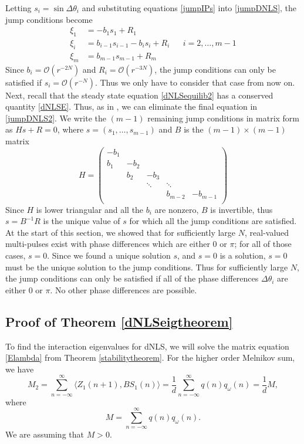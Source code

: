 \documentclass[12pt]{article}
\begin{document}
Letting $s_i = \sin{\Delta\theta_i}$ and substituting equations \eqref{jumpIPs} into \eqref{jumpDNLS}, the jump conditions become
\begin{equation}\label{jumpDNLS2}
\begin{aligned}
\xi_1 &= -b_1 s_1 + R_1 \\
\xi_i &= b_{i-1} s_{i-1} - b_i s_i + R_i
&& i = 2, \dots, m-1 \\
\xi_m &= b_{m-1} s_{m-1} + R_m
\end{aligned}
\end{equation}
Since $b_i = \mathcal{O}(r^{-2N})$ and $R_i = \mathcal{O}(r^{-3N})$, the jump conditions can only be satisfied if $s_i = \mathcal{O}(r^{-N})$. Thus we only have to consider that case from now on. Next, recall that the steady state equation \eqref{dNLSequilib2} has a conserved quantity \eqref{dNLSE}. Thus, as in \cite{SandstedeStrut}, we can eliminate the final equation in \eqref{jumpDNLS2}. We write the $(m-1)$ remaining jump conditions in matrix form as $H s + R = 0$, where $s = (s_1, \dots, s_{m-1})$ and $B$ is the $(m-1)\times(m-1)$ matrix
\[
H = \begin{pmatrix}
-b_1 \\
b_1 & -b_2 \\
& b_2 & -b_3 \\
&& \ddots & \ddots \\
&&& b_{m-2} & -b_{m-1} \\
\end{pmatrix}
\]
Since $H$ is lower triangular and all the $b_i$ are nonzero, $B$ is invertible, thus $s = B^{-1}R$ is the unique value of $s$ for which all the jump conditions are satisfied. At the start of this section, we showed that for sufficiently large $N$, real-valued multi-pulses exist with phase differences which are either 0 or $\pi$; for all of those cases, $s = 0$. Since we found a unique solution $s$, and $s = 0$ is a solution, $s = 0$ must be the unique solution to the jump conditions. Thus for sufficiently large $N$, the jump conditions can only be satisfied if all of the phase differences $\Delta \theta_i$ are either 0 or $\pi$. No other phase differences are possible.

\subsection{Proof of Theorem \ref{dNLSeigtheorem}}

To find the interaction eigenvalues for dNLS, we will solve the matrix equation \eqref{Elambda} from Theorem \ref{stabilitytheorem}. For the higher order Melnikov sum, we have
\[
M_2 = \sum_{n=-\infty}^\infty \langle Z_1(n+1), B S_1(n) \rangle =
\frac{1}{d} \sum_{n=-\infty}^\infty q(n) q_\omega(n) = \frac{1}{d}M,
\]
where
\[
M = \sum_{n=-\infty}^\infty q(n) q_\omega(n).
\]
We are assuming that $M > 0$. 
\end{document}
